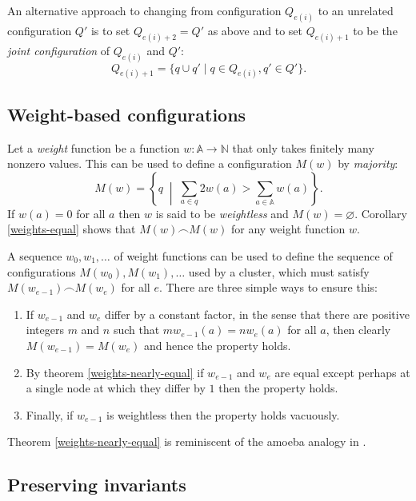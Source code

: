 \documentclass[journal]{IEEEtran}
\begin{document}
An alternative approach to changing from configuration $Q_{e(i)}$ to an
unrelated configuration $Q'$ is to set $Q_{e(i)+2} = Q'$ as above and to set
$Q_{e(i)+1}$ to be the \textit{joint configuration} of $Q_{e(i)}$ and $Q'$:
\[Q_{e(i)+1} = \{ q \cup q' \mid q \in Q_{e(i)}, q' \in Q' \}.\]

\subsection{Weight-based configurations} \label{weight-based-configurations}

Let a \textit{weight} function be a function $w : \mathbb A \to \mathbb N$ that
only takes finitely many nonzero values. This can be used to define a
configuration $M(w)$ by \textit{majority}: \[M(w) = \left\{ q \;\middle|\;
\sum_{a \in q} 2 w(a) > \sum_{a \in \mathbb A} w(a) \right\}.\] If $w(a) = 0$
for all $a$ then $w$ is said to be \textit{weightless} and $M(w) =
\varnothing$.  Corollary \ref{weights-equal} shows that $M(w) \frown M(w)$ for
any weight function $w$.

A sequence $w_0, w_1, \ldots$ of weight functions can be used to define the
sequence of configurations $M(w_0), M(w_1), \ldots$ used by a cluster, which
must satisfy $M(w_{e-1}) \frown M(w_e)$ for all $e$.  There are three simple
ways to ensure this:

\begin{enumerate}

\item If $w_{e-1}$ and $w_e$ differ by a constant factor, in the sense that
there are positive integers $m$ and $n$ such that $m w_{e-1}(a) = n w_e(a)$ for
all $a$, then clearly ${M(w_{e-1}) = M(w_e)}$ and hence the property holds.

\item By theorem \ref{weights-nearly-equal} if $w_{e-1}$ and $w_e$ are equal
except perhaps at a single node at which they differ by $1$ then the property
holds.

\item Finally, if $w_{e-1}$ is weightless then the property holds vacuously.

\end{enumerate}
%
Theorem \ref{weights-nearly-equal} is reminiscent of the amoeba analogy in
\cite{cheap-paxos}.

\subsection{Preserving invariants}
\end{document}
